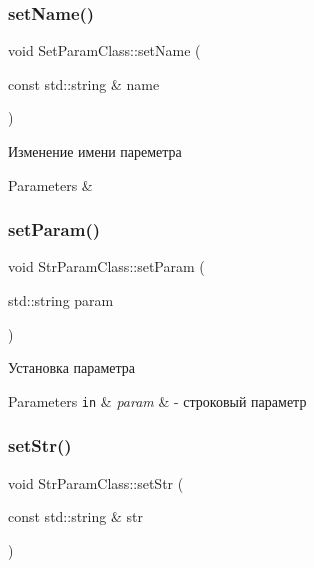 \subsubsection{\texorpdfstring{set\+Name()}{setName()}}
{\footnotesize\ttfamily void Set\+Param\+Class\+::set\+Name (\begin{DoxyParamCaption}\item[{const std\+::string \&}]{name }\end{DoxyParamCaption})\hspace{0.3cm}{\ttfamily [inherited]}}



Изменение имени пареметра 


\begin{DoxyParams}{Parameters}
{\em } & \\
\hline
\end{DoxyParams}
\mbox{\label{class_str_param_class_aaaa268386a5159ba1c26532b71f1e326}} 
\subsubsection{\texorpdfstring{set\+Param()}{setParam()}}
{\footnotesize\ttfamily void Str\+Param\+Class\+::set\+Param (\begin{DoxyParamCaption}\item[{std\+::string}]{param }\end{DoxyParamCaption})}



Установка параметра 


\begin{DoxyParams}[1]{Parameters}
\mbox{\tt in}  & {\em param} & -\/ строковый параметр \\
\hline
\end{DoxyParams}
\mbox{\label{class_str_param_class_a4978b404ff3ebc96a13be228a86a8129}} 
\subsubsection{\texorpdfstring{set\+Str()}{setStr()}}
{\footnotesize\ttfamily void Str\+Param\+Class\+::set\+Str (\begin{DoxyParamCaption}\item[{const std\+::string \&}]{str }\end{DoxyParamCaption})\hspace{0.3cm}{\ttfamily [virtual]}}



